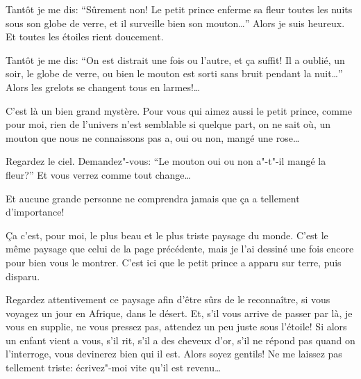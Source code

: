Tantôt je me dis: ``Sûrement non! Le petit prince enferme sa fleur toutes les
nuits sous son globe de verre, et il surveille bien son mouton\ldots{}'' Alors
je suis heureux. Et toutes les étoiles rient doucement.

Tantôt je me dis: ``On est distrait une fois ou l'autre, et ça suffit! Il a
oublié, un soir, le globe de verre, ou bien le mouton est sorti sans bruit
pendant la nuit\ldots{}'' Alors les grelots se changent tous en larmes!\ldots{}

\medskip

C'est là un bien grand mystère. Pour vous qui aimez aussi le petit prince,
comme pour moi, rien de l'univers n'est semblable si quelque part, on ne sait
où, un mouton que nous ne connaissons pas a, oui ou non, mangé une rose\ldots{}

Regardez le ciel. Demandez"-vous: ``Le mouton oui ou non a"-t"-il mangé la
fleur?'' Et vous verrez comme tout change\ldots{}

Et aucune grande personne ne comprendra jamais que ça a tellement d'importance!

Ça c'est, pour moi, le plus beau et le plus triste paysage du monde. C’est
le même paysage que celui de la page précédente, mais je l'ai dessiné une fois
encore pour bien vous le montrer. C'est ici que le petit prince a apparu sur
terre, puis disparu.

Regardez attentivement ce paysage afin d'être sûrs de le reconnaître, si vous
voyagez un jour en Afrique, dans le désert. Et, s'il vous arrive de passer par
là, je vous en supplie, ne vous pressez pas, attendez un peu juste sous l'étoile!
Si alors un enfant vient a vous, s'il rit, s'il a des cheveux d'or, s'il ne
répond pas quand on l'interroge, vous devinerez bien qui il est. Alors soyez
gentils! Ne me laissez pas tellement triste: écrivez"-moi vite qu'il est
revenu\ldots{}
